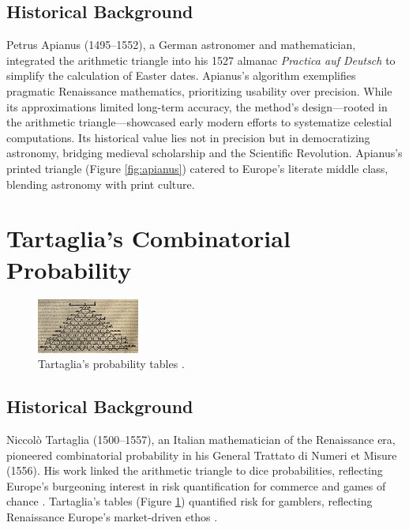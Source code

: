 \documentclass{article}
\begin{document}
\subsection{Historical Background}

Petrus Apianus (1495–1552), a German astronomer and mathematician, integrated the arithmetic triangle into his 1527 almanac \textit{Practica auf Deutsch} to simplify the calculation of Easter dates. Apianus’s algorithm exemplifies pragmatic Renaissance mathematics, prioritizing usability over precision. While its approximations limited long-term accuracy, the method’s design—rooted in the arithmetic triangle—showcased early modern efforts to systematize celestial computations. Its historical value lies not in precision but in democratizing astronomy, bridging medieval scholarship and the Scientific Revolution. Apianus’s printed triangle (Figure \ref{fig:apianus}) catered to Europe’s literate middle class, blending astronomy with print culture\citep{boyer1950}. 

\section{Tartaglia’s Combinatorial Probability}

\begin{figure}[h!tbp]
\centering
\includegraphics[width=0.3\textwidth]{Essay/Draft_2/Tartaglia.jpg}
\caption{Tartaglia’s probability tables \citep{tartaglia1556}.}
\label{fig:tartaglia}
\end{figure}

\subsection{Historical Background}

Niccolò Tartaglia (1500–1557), an Italian mathematician of the Renaissance era, pioneered combinatorial probability in his General Trattato di Numeri et Misure (1556). His work linked the arithmetic triangle to dice probabilities, reflecting Europe’s burgeoning interest in risk quantification for commerce and games of chance \citep{tartaglia1556}. Tartaglia’s tables (Figure \ref{fig:tartaglia}) quantified risk for gamblers, reflecting Renaissance Europe’s market-driven ethos \citep{hinz1992}.
\end{document}
